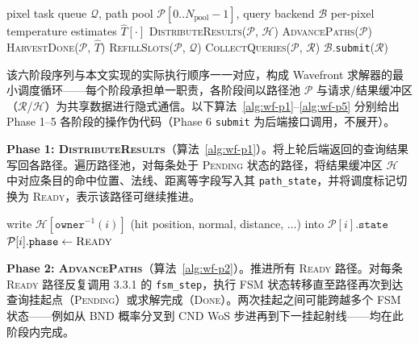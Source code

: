 \begin{algorithm}
\caption{Wavefront 耦合热输运求解器主循环}
\label{alg:wf-main-loop}
\begin{algorithmic}[1]
\REQUIRE pixel task queue $\mathcal{Q}$, path pool $\mathcal{P}[0..N_\text{pool}-1]$, query backend $\mathcal{B}$
\ENSURE per-pixel temperature estimates $\hat{T}[\cdot]$
  \STATE \textsc{DistributeResults}($\mathcal{P}$, $\mathcal{H}$) 
  \STATE \textsc{AdvancePaths}($\mathcal{P}$) 
  \STATE \textsc{HarvestDone}($\mathcal{P}$, $\hat{T}$) 
  \STATE \textsc{RefillSlots}($\mathcal{P}$, $\mathcal{Q}$) 
  \STATE \textsc{CollectQueries}($\mathcal{P}$, $\mathcal{R}$) 
  \STATE $\mathcal{B}$.\texttt{submit}($\mathcal{R}$) 
\ENDWHILE
\end{algorithmic}
\end{algorithm}

该六阶段序列与本文实现的实际执行顺序一一对应，构成 Wavefront 求解器的最小调度循环——每个阶段承担单一职责，各阶段间以路径池 $\mathcal{P}$ 与请求/结果缓冲区（$\mathcal{R}$/$\mathcal{H}$）为共享数据进行隐式通信。以下算法~\ref{alg:wf-p1}--\ref{alg:wf-p5} 分别给出 Phase 1--5 各阶段的操作伪代码（Phase 6 \texttt{submit} 为后端接口调用，不展开）。

\textbf{Phase 1: \textsc{DistributeResults}}（算法~\ref{alg:wf-p1}）。将上轮后端返回的查询结果写回各路径。遍历路径池，对每条处于 \textsc{Pending} 状态的路径，将结果缓冲区 $\mathcal{H}$ 中对应条目的命中位置、法线、距离等字段写入其 \texttt{path\_state}，并将调度标记切换为 \textsc{Ready}，表示该路径可继续推进。

\begin{algorithm}[htbp]
\caption{\textsc{DistributeResults} — 查询结果回填}
\label{alg:wf-p1}
\begin{algorithmic}[1]
    \STATE write $\mathcal{H}[\texttt{owner}^{-1}(i)]$ (hit position, normal, distance, $\ldots$) into $\mathcal{P}[i].\texttt{state}$
    \STATE $\mathcal{P}[i].\texttt{phase} \leftarrow \textsc{Ready}$
  \ENDIF
\ENDFOR
\end{algorithmic}
\end{algorithm}

\textbf{Phase 2: \textsc{AdvancePaths}}（算法~\ref{alg:wf-p2}）。推进所有 \textsc{Ready} 路径。对每条 \textsc{Ready} 路径反复调用 3.3.1 的 \texttt{fsm\_step}，执行 FSM 状态转移直至路径再次到达查询挂起点（\textsc{Pending}）或求解完成（\textsc{Done}）。两次挂起之间可能跨越多个 FSM 状态——例如从 BND 概率分叉到 CND WoS 步进再到下一挂起射线——均在此阶段内完成。


